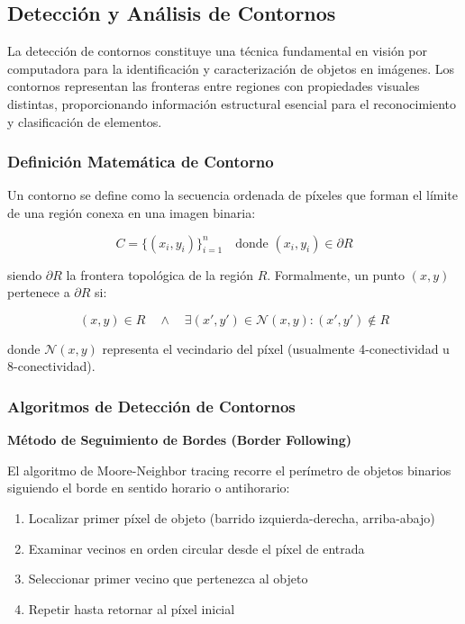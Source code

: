 \subsection{Detección y Análisis de Contornos}

La detección de contornos constituye una técnica fundamental en visión por computadora para la identificación y caracterización de objetos en imágenes. Los contornos representan las fronteras entre regiones con propiedades visuales distintas, proporcionando información estructural esencial para el reconocimiento y clasificación de elementos.

\subsubsection{Definición Matemática de Contorno}

Un contorno se define como la secuencia ordenada de píxeles que forman el límite de una región conexa en una imagen binaria:

\begin{equation}
C = \{(x_i, y_i)\}_{i=1}^{n} \quad \text{donde } (x_i, y_i) \in \partial R
\end{equation}

siendo $\partial R$ la frontera topológica de la región $R$. Formalmente, un punto $(x,y)$ pertenece a $\partial R$ si:

\begin{equation}
(x,y) \in R \quad \land \quad \exists (x',y') \in \mathcal{N}(x,y) : (x',y') \notin R
\end{equation}

donde $\mathcal{N}(x,y)$ representa el vecindario del píxel (usualmente 4-conectividad u 8-conectividad).

\subsubsection{Algoritmos de Detección de Contornos}

\textbf{Método de Seguimiento de Bordes (Border Following)}

El algoritmo de Moore-Neighbor tracing recorre el perímetro de objetos binarios siguiendo el borde en sentido horario o antihorario:

\begin{enumerate}
\item Localizar primer píxel de objeto (barrido izquierda-derecha, arriba-abajo)
\item Examinar vecinos en orden circular desde el píxel de entrada
\item Seleccionar primer vecino que pertenezca al objeto
\item Repetir hasta retornar al píxel inicial
\end{enumerate}

